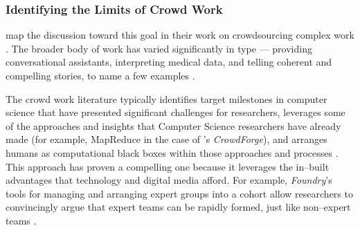 \documentclass[trackingWork]{subfiles}
\begin{document}
\subsubsection[What are the limits of crowd work]{Identifying the Limits of Crowd Work}\label{sec:complexity}
\subsubsubsection{\crowdworkpers}
\citeauthor{crowdForgeKittur}
map the discussion toward this goal in their work on
crowdsourcing complex work
\cite{crowdForgeKittur}.
The broader body of work has varied significantly in type
--- providing conversational assistants,
interpreting medical data, and
telling coherent and compelling stories,
to name a few examples
\cite{Lasecki:2013:CCC:2501988.2502057,mavandadi2012distributed,KimStoria}.

The crowd work literature typically identifies target milestones in computer science
that have presented significant challenges for researchers,
leverages some of the approaches and insights that Computer Science researchers have already made
(for example, MapReduce in the case of \citeauthor{crowdForgeKittur}'s \textit{CrowdForge}),
and arranges humans as computational black boxes within those approaches and processes
\cite[][and others]{crowdForgeKittur,foundry}.
This approach has proven a compelling one because
it leverages the in--built advantages that technology and digital media afford.
For example, \textit{Foundry}'s tools for managing and arranging expert groups into a cohort
allow researchers to convincingly argue that expert teams can be rapidly formed,
just like non--expert teams
\cite{foundry}.
\end{document}
